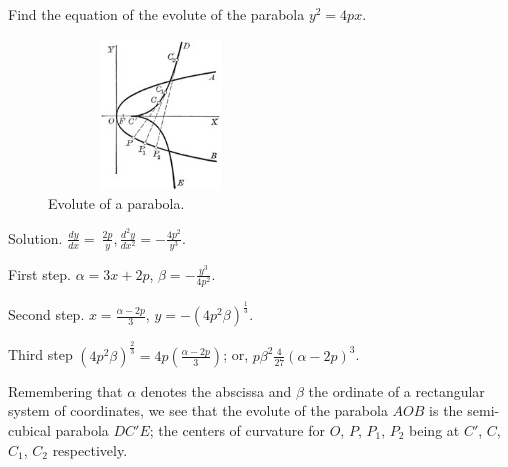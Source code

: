 \begin{example}
Find the equation of the evolute of the parabola $y^2 = 4px$.

\begin{figure}[h!]
\begin{minipage}{\textwidth}
\begin{center}
\includegraphics[height=4cm,width=6cm]{evolute-of-parabola.eps}
\end{center}
\end{minipage}
\caption{Evolute of a parabola.}
\label{fig:evolute-of-parabola}
\end{figure}
 

Solution. 	
$\frac{dy}{dx} 	=\ \frac{2p}{y}, \frac{d^2 y}{dx^2} = -\frac{4p^2}{y^3}$.

First step. 	
$\alpha= 3x + 2p$, $\beta = -\frac{y^3}{4p^2}$.

Second step. 	
$x= \frac{\alpha - 2p}{3}$, $y = -(4p^2 \beta)^{\frac{1}{3}}$.

Third step 	
$(4p^2 \beta)^{\frac{2}{3}} = 4p \left( \frac{\alpha - 2p}{3} \right)$;  
or, $p\beta^2\frac{4}{27} (\alpha - 2p)^3$.

Remembering that $\alpha$ denotes the abscissa and $\beta$ the 
ordinate of a rectangular system of coordinates, 
we see that the evolute of the parabola $AOB$ is the semi-cubical 
parabola $DC'E$; the centers of curvature for $O$, $P$, $P_1$, $P_2$ 
being at $C'$, $C$, $C_1$, $C_2$ respectively.
\end{example}

